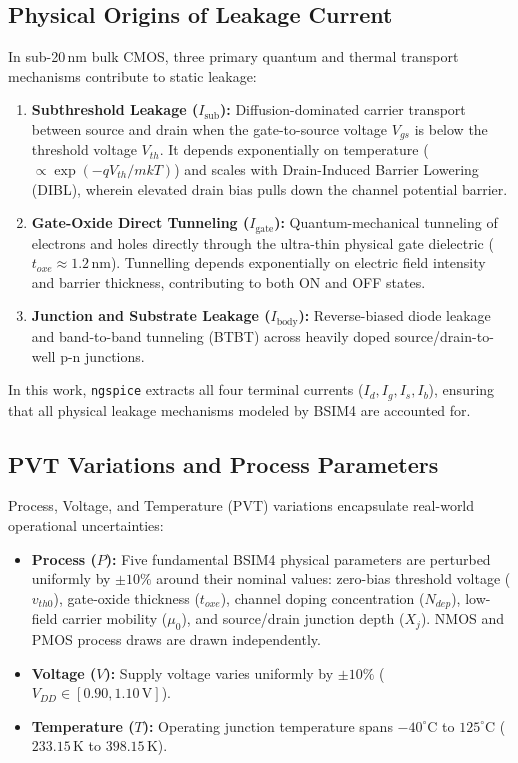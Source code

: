 \documentclass[11pt,a4paper]{article}
\numberwithin{table}{section}
\numberwithin{figure}{section}
\begin{document}
\subsection{Physical Origins of Leakage Current}
In sub-20\,nm bulk CMOS, three primary quantum and thermal transport mechanisms contribute to static leakage:
\begin{enumerate}[noitemsep]
    \item \textbf{Subthreshold Leakage ($I_{\mathrm{sub}}$):} Diffusion-dominated carrier transport between source and drain when the gate-to-source voltage $V_{gs}$ is below the threshold voltage $V_{th}$. It depends exponentially on temperature ($\propto \exp(-qV_{th}/mkT)$) and scales with Drain-Induced Barrier Lowering (DIBL), wherein elevated drain bias pulls down the channel potential barrier.
    \item \textbf{Gate-Oxide Direct Tunneling ($I_{\mathrm{gate}}$):} Quantum-mechanical tunneling of electrons and holes directly through the ultra-thin physical gate dielectric ($t_{oxe} \approx 1.2\,\mathrm{nm}$). Tunnelling depends exponentially on electric field intensity and barrier thickness, contributing to both ON and OFF states.
    \item \textbf{Junction and Substrate Leakage ($I_{\mathrm{body}}$):} Reverse-biased diode leakage and band-to-band tunneling (BTBT) across heavily doped source/drain-to-well p-n junctions.
\end{enumerate}
In this work, \texttt{ngspice} extracts all four terminal currents ($I_d, I_g, I_s, I_b$), ensuring that all physical leakage mechanisms modeled by BSIM4 are accounted for.

\subsection{PVT Variations and Process Parameters}
Process, Voltage, and Temperature (PVT) variations encapsulate real-world operational uncertainties:
\begin{itemize}[noitemsep]
    \item \textbf{Process ($P$):} Five fundamental BSIM4 physical parameters are perturbed uniformly by $\pm 10\%$ around their nominal values: zero-bias threshold voltage ($v_{th0}$), gate-oxide thickness ($t_{oxe}$), channel doping concentration ($N_{dep}$), low-field carrier mobility ($\mu_0$), and source/drain junction depth ($X_j$). NMOS and PMOS process draws are drawn independently.
    \item \textbf{Voltage ($V$):} Supply voltage varies uniformly by $\pm 10\%$ ($V_{DD} \in [0.90, 1.10\,\mathrm{V}]$).
    \item \textbf{Temperature ($T$):} Operating junction temperature spans $-40^\circ\mathrm{C}$ to $125^\circ\mathrm{C}$ ($233.15\,\mathrm{K}$ to $398.15\,\mathrm{K}$).
\end{itemize}
\end{document}
